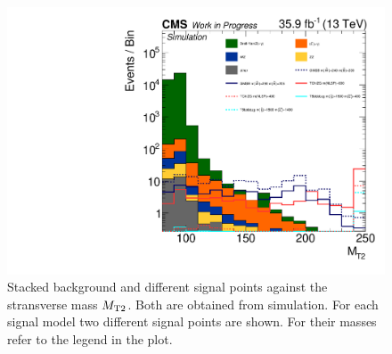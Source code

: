 \begin{figure}
 \centering
 \includegraphics[width=\pairwidth]{figures/mt2/onZ_LL_mt2_log}
 \caption{Stacked background and different signal points against the stransverse mass $M_{\mathrm{T2}}$. Both are obtained from simulation. For each signal model two different signal points are shown. For their masses refer to the legend in the plot.}
 \label{fig:mt2}
\end{figure}


